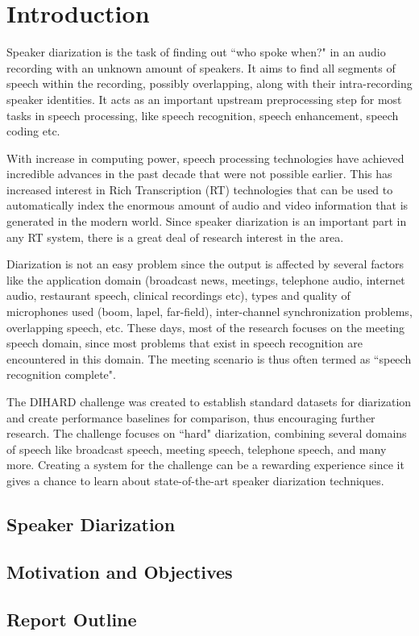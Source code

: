 \chapter{Introduction}

Speaker diarization is the task of finding out ``who spoke when?" in an audio recording with an unknown amount of speakers. It aims to find all segments of speech within the recording, possibly overlapping, along with their intra-recording speaker identities. It acts as an important upstream preprocessing step for most tasks in speech processing, like speech recognition, speech enhancement, speech coding etc.

With increase in computing power, speech processing technologies have achieved incredible advances in the past decade that were not possible earlier. This has increased interest in Rich Transcription (RT) technologies that can be used to automatically index the enormous amount of audio and video information that is generated in the modern world. Since speaker diarization is an important part in any RT system, there is a great deal of research interest in the area.

Diarization is not an easy problem since the output is affected by several factors like the application domain (broadcast news, meetings, telephone audio, internet audio, restaurant speech, clinical recordings etc), types and quality of microphones used (boom, lapel, far-field), inter-channel synchronization problems, overlapping speech, etc. These days, most of the research focuses on the meeting speech domain, since most problems that exist in speech recognition are encountered in this domain. The meeting scenario is thus often termed as ``speech recognition complete".

The DIHARD challenge was created to establish standard datasets for diarization and create performance baselines for comparison, thus encouraging further research. The challenge focuses on ``hard" diarization, combining several domains of speech like broadcast speech, meeting speech, telephone speech, and many more. Creating a system for the challenge can be a rewarding experience since it gives a chance to learn about state-of-the-art speaker diarization techniques.

\section{Speaker Diarization}

\section{Motivation and Objectives}

\section{Report Outline}

